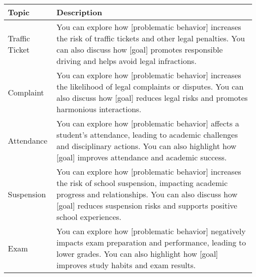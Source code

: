 \begin{table*}[tb]
\centering
\begin{tabularx}{\textwidth}{lX}
\toprule
Topic            & Description                                            \\ \midrule
Traffic Ticket              & You can explore how [problematic behavior] increases the risk of traffic tickets and other legal penalties. You can also discuss how [goal] promotes responsible driving and helps avoid legal infractions.                                                                                                                                                                                                                        \\ \hline
Complaint                   & You can explore how [problematic behavior] increases the likelihood of legal complaints or disputes. You can also discuss how [goal] reduces legal risks and promotes harmonious interactions.                                                                                                                                                                                                                                     \\ \hline
Attendance                  & You can explore how [problematic behavior] affects a student’s attendance, leading to academic challenges and disciplinary actions. You can also highlight how [goal] improves attendance and academic success.                                                                                                                                                                                                                    \\ \hline
Suspension                  & You can explore how [problematic behavior] increases the risk of school suspension, impacting academic progress and relationships. You can also discuss how [goal] reduces suspension risks and supports positive school experiences.                                                                                                                                                                                              \\ \hline
Exam                        & You can explore how [problematic behavior] negatively impacts exam preparation and performance, leading to lower grades. You can also highlight how [goal] improves study habits and exam results.                                                                                                                                                                                                                                 \\ \hline

\end{tabularx}
\end{table*}
